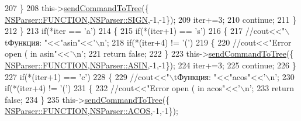 \begin{DoxyCode}
207                         \}
208                         this->\hyperlink{classParser_ac61a1fedefe50ed900f0e65c029053c1}{sendCommandToTree}(\{
      \hyperlink{namespaceNSParser_aca012df556c0413c6166348fdd62c4eba4adabba7d2f386bba54639075a582a36}{NSParser::FUNCTION},\hyperlink{namespaceNSParser_aae20df1402d72f463a1a9efe3ce1a9b9ae049848210127b105cfc43deae883072}{NSParser::SIGN},-1,-1\});
209                         iter+=3;
210                         \textcolor{keywordflow}{continue};
211                     \}
212                 \}
213                 \textcolor{keywordflow}{if}(*iter == \textcolor{charliteral}{'a'})
214                 \{
215                     \textcolor{keywordflow}{if}(*(iter+1) == \textcolor{charliteral}{'s'})
216                     \{
217                         \textcolor{comment}{//cout<<"\(\backslash\)tФункция: "<<"asin"<<'\(\backslash\)n';}
218                         \textcolor{keywordflow}{if}(*(iter+4) != \textcolor{charliteral}{'('})
219                         \{
220                             \textcolor{comment}{//cout<<"Error open ( in asin"<<'\(\backslash\)n';}
221                             \textcolor{keywordflow}{return} \textcolor{keyword}{false};
222                         \}
223                         this->\hyperlink{classParser_ac61a1fedefe50ed900f0e65c029053c1}{sendCommandToTree}(\{
      \hyperlink{namespaceNSParser_aca012df556c0413c6166348fdd62c4eba4adabba7d2f386bba54639075a582a36}{NSParser::FUNCTION},\hyperlink{namespaceNSParser_aae20df1402d72f463a1a9efe3ce1a9b9a68ae975169c90b9cb6232cec5bbeebca}{NSParser::ASIN},-1,-1\});
224                         iter+=3;
225                         \textcolor{keywordflow}{continue};
226                     \}
227                     \textcolor{keywordflow}{if}(*(iter+1) == \textcolor{charliteral}{'c'})
228                     \{
229                         \textcolor{comment}{//cout<<"\(\backslash\)tФункция: "<<"acos"<<'\(\backslash\)n';}
230                         \textcolor{keywordflow}{if}(*(iter+4) != \textcolor{charliteral}{'('})
231                         \{
232                             \textcolor{comment}{//cout<<"Error open ( in acos"<<'\(\backslash\)n';}
233                             \textcolor{keywordflow}{return} \textcolor{keyword}{false};
234                         \}
235                         this->\hyperlink{classParser_ac61a1fedefe50ed900f0e65c029053c1}{sendCommandToTree}(\{
      \hyperlink{namespaceNSParser_aca012df556c0413c6166348fdd62c4eba4adabba7d2f386bba54639075a582a36}{NSParser::FUNCTION},\hyperlink{namespaceNSParser_aae20df1402d72f463a1a9efe3ce1a9b9a6e166b7b8ca1eb0877e5906ec1433bb2}{NSParser::ACOS},-1,-1\});

\end{DoxyCode}
